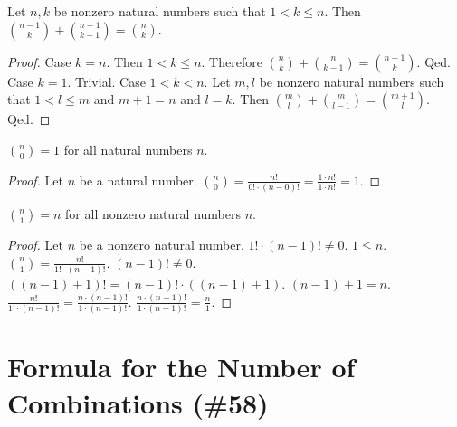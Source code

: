 \documentclass{article}
\begin{document}
\begin{forthel}
\begin{lemma}
Let $n,k$ be nonzero natural numbers such that $1 < k \leq n$.
Then $\binom{n-1}{k} + \binom{n-1}{k-1} = \binom{n}{k}$.
\end{lemma}
\begin{proof}
Case $k = n$.
Then $1 < k \leq n$.
Therefore $\binom{n}{k} + \binom{n}{k-1} = \binom{n+1}{k}$.
Qed.
Case $k = 1$. Trivial.
Case $1 < k < n$.
Let $m,l$ be nonzero natural numbers 
such that $1 < l \leq m$ and $m+1 =n$ and $l = k$.
Then $\binom{m}{l} + \binom{m}{l-1} = \binom{m+1}{l}$.
Qed.
\end{proof}

\begin{lemma}
$\binom{n}{0}=1$ for all natural numbers $n$.
\end{lemma}
\begin{proof}
Let $n$ be a natural number.
$\binom{n}{0} 
= \frac{n!}{0! \cdot (n-0)!} 
= \frac{1 \cdot n!}{1 \cdot n!} 
= 1$.
\end{proof}

\begin{lemma}
$\binom{n}{1}=n$ for all nonzero natural numbers $n$.
\end{lemma}
\begin{proof}
Let $n$ be a nonzero natural number.
$1! \cdot (n-1)! \neq 0$.
$1 \leq n$.
$\binom{n}{1} = \frac{n!}{1! \cdot (n-1)!}$.
$(n-1)! \neq 0$.
$((n-1)+1)! = (n-1)! \cdot ((n-1)+1)$.
$(n-1)+1 = n$.
$\frac{n!}{1! \cdot (n-1)!} 
= \frac{n \cdot (n-1)!}{1 \cdot (n-1)!}$.
$\frac{n \cdot (n-1)!}{1 \cdot (n-1)!}
= \frac{n}{1}$.
\end{proof}

\end{forthel}

\section{Formula for the Number of Combinations (\#58)}
\end{document}
